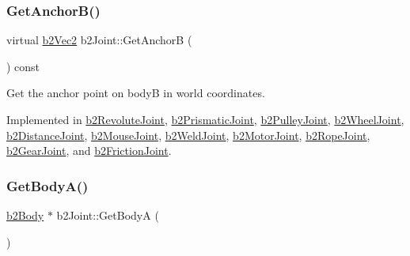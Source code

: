 \mbox{\label{classb2_joint_a88e947c65d4ea26fe539f02a8cb7f7a9}} 
\subsubsection{\texorpdfstring{GetAnchorB()}{GetAnchorB()}}
{\footnotesize\ttfamily virtual \mbox{\hyperlink{structb2_vec2}{b2\+Vec2}} b2\+Joint\+::\+Get\+AnchorB (\begin{DoxyParamCaption}{ }\end{DoxyParamCaption}) const\hspace{0.3cm}{\ttfamily [pure virtual]}}



Get the anchor point on bodyB in world coordinates. 



Implemented in \mbox{\hyperlink{classb2_revolute_joint_aa30a5d414b2ff699cc17567ff6e53e6b}{b2\+Revolute\+Joint}}, \mbox{\hyperlink{classb2_prismatic_joint_a7e1d328bfd05895fd228c07bac41b9e5}{b2\+Prismatic\+Joint}}, \mbox{\hyperlink{classb2_pulley_joint_aee56f103c1d1d30fcbd3a8570e321ba9}{b2\+Pulley\+Joint}}, \mbox{\hyperlink{classb2_wheel_joint_a62f450ad368793c3cde36404a39775e0}{b2\+Wheel\+Joint}}, \mbox{\hyperlink{classb2_distance_joint_a05bf71de10904c87e3a5295aa04a8aa6}{b2\+Distance\+Joint}}, \mbox{\hyperlink{classb2_mouse_joint_adecfaff123ba199f9fc80be7fcb74af2}{b2\+Mouse\+Joint}}, \mbox{\hyperlink{classb2_weld_joint_ac97596e42af760d0a035b15213d3341a}{b2\+Weld\+Joint}}, \mbox{\hyperlink{classb2_motor_joint_a5d563fd070f7b6cfe8db6f83e1bebbcd}{b2\+Motor\+Joint}}, \mbox{\hyperlink{classb2_rope_joint_a5e1d615b5cff50b367a74e109184e5d5}{b2\+Rope\+Joint}}, \mbox{\hyperlink{classb2_gear_joint_a3d24a3265e64f36017404a36abcb7889}{b2\+Gear\+Joint}}, and \mbox{\hyperlink{classb2_friction_joint_af5a025b64221aafa98393d47d8414328}{b2\+Friction\+Joint}}.

\mbox{\label{classb2_joint_a2ed5eca3dbdce48665c14452b280613f}} 
\subsubsection{\texorpdfstring{GetBodyA()}{GetBodyA()}}
{\footnotesize\ttfamily \mbox{\hyperlink{classb2_body}{b2\+Body}} $\ast$ b2\+Joint\+::\+Get\+BodyA (\begin{DoxyParamCaption}{ }\end{DoxyParamCaption})\hspace{0.3cm}{\ttfamily [inline]}}



